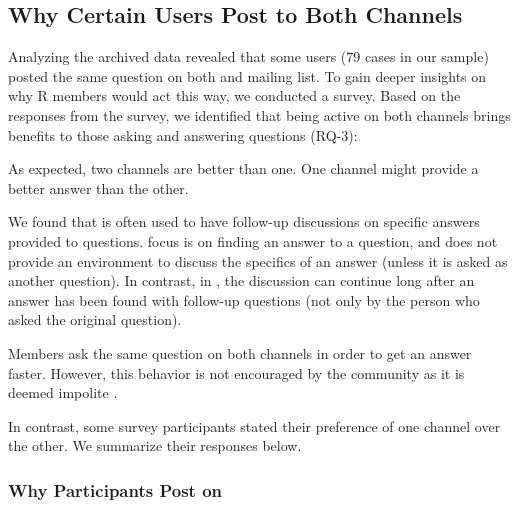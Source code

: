 \subsection{Why Certain Users Post to Both Channels}
Analyzing the archived data revealed that some users (79 cases in our sample) posted the same question on both \SO and \RH mailing list. To gain deeper insights on why R members would act this way, we conducted a survey. Based on the responses from the survey, we identified that being active on both channels brings benefits to those asking and answering questions (RQ-3):

\begin{description}[itemsep=2pt, topsep=0pt, leftmargin=1em, parsep=0pt]
\item[Find a better answer:] As expected, two channels are better than one. 
  One channel might provide a better answer than the other.
\item[Support follow-up questions:] We found that \RH is often used to have follow-up discussions on
  specific answers provided to \SO questions. \SO focus is on finding an answer to a question, and does not
  provide an environment to discuss the specifics of an answer (unless it is asked as another question).
In contrast, in \RH, the discussion can continue long after an answer has been found with follow-up questions (not only by the person who asked the original question).  
\item[Speeds up answers:] Members ask the same question on both channels in order to get an answer faster. However, this behavior is not encouraged by the community as it is deemed impolite%
.
\end{description}


In contrast, some survey participants stated their preference of one channel over the other. We summarize their responses below.

\subsubsection{Why Participants Post on \SO}

